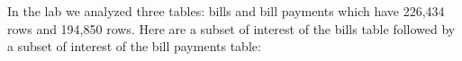 \documentclass[12pt]{article}
\begin{document}
%
%
%
%
%
%
%
%


\problem In the lab we analyzed three tables: bills and bill payments which have 226,434 rows and 194,850 rows. Here are a subset of interest of the bills table followed by a subset of interest of the bill payments table:
\end{document}
